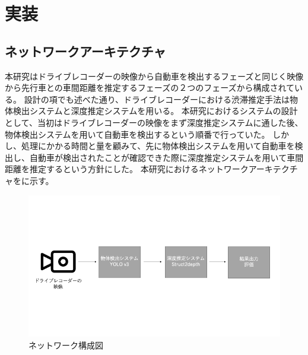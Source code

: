 \newpage
\section{実装}
\subsection{ネットワークアーキテクチャ}
本研究はドライブレコーダーの映像から自動車を検出するフェーズと同じく映像から先行車との車間距離を推定するフェーズの２つのフェーズから構成されている。
設計の項でも述べた通り、ドライブレコーダーにおける渋滞推定手法は物体検出システムと深度推定システムを用いる。
本研究におけるシステムの設計として、当初はドライブレコーダーの映像をまず深度推定システムに通した後、物体検出システムを用いて自動車を検出するという順番で行っていた。
しかし、処理にかかる時間と量を顧みて、先に物体検出システムを用いて自動車を検出し、自動車が検出されたことが確認できた際に深度推定システムを用いて車間距離を推定するという方針にした。
本研究におけるネットワークアーキテクチャをに示す。

\begin{figure}[htbp]
  \begin{center}
    \includegraphics[width=\textwidth]{figs/system_buildver1.png}
    \caption{ネットワーク構成図}
    \label{fig:system_arch}
  \end{center}
\end{figure}

\newpage

